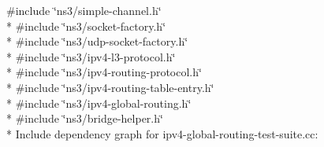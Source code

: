 {\ttfamily \#include \char`\"{}ns3/simple-\/channel.\+h\char`\"{}}\\*
{\ttfamily \#include \char`\"{}ns3/socket-\/factory.\+h\char`\"{}}\\*
{\ttfamily \#include \char`\"{}ns3/udp-\/socket-\/factory.\+h\char`\"{}}\\*
{\ttfamily \#include \char`\"{}ns3/ipv4-\/l3-\/protocol.\+h\char`\"{}}\\*
{\ttfamily \#include \char`\"{}ns3/ipv4-\/routing-\/protocol.\+h\char`\"{}}\\*
{\ttfamily \#include \char`\"{}ns3/ipv4-\/routing-\/table-\/entry.\+h\char`\"{}}\\*
{\ttfamily \#include \char`\"{}ns3/ipv4-\/global-\/routing.\+h\char`\"{}}\\*
{\ttfamily \#include \char`\"{}ns3/bridge-\/helper.\+h\char`\"{}}\\*
Include dependency graph for ipv4-\/global-\/routing-\/test-\/suite.cc\+:
